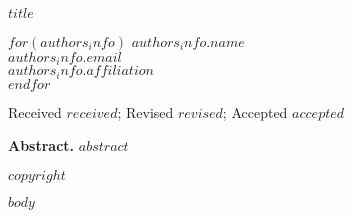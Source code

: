 \documentclass[letterpaper,twoside,12pt]{article}
\begin{document}
\thispagestyle{firstpagefooter}

\begingroup  
\LARGE{\textbf{$title$}}\normalsize

\bigskip

$for(authors_info)$
  \textbf{$authors_info.name$} \\
  \href{mailto:$authors_info.email$}{$authors_info.email$} \\
  \textit{$authors_info.affiliation$}\\
$endfor$

Received $received$; Revised $revised$; Accepted $accepted$

\bigskip

\textbf{Abstract.} $abstract$

$copyright$
\endgroup

$body$
\end{document}
